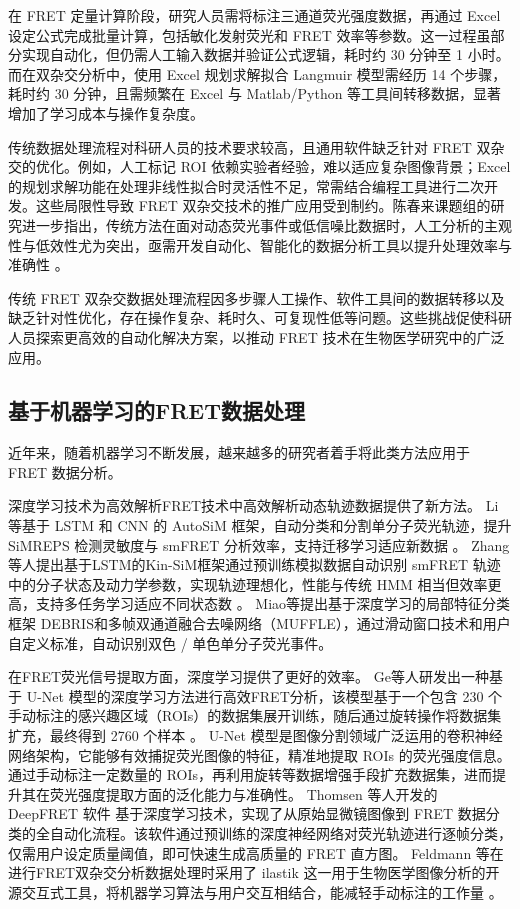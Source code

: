 在 FRET 定量计算阶段，研究人员需将标注三通道荧光强度数据，再通过 Excel 设定公式完成批量计算，包括敏化发射荧光和 FRET 效率等参数。这一过程虽部分实现自动化，但仍需人工输入数据并验证公式逻辑，耗时约 30 分钟至 1 小时。而在双杂交分析中，使用 Excel 规划求解拟合 Langmuir 模型需经历 14 个步骤，耗时约 30 分钟，且需频繁在 Excel 与 Matlab/Python 等工具间转移数据，显著增加了学习成本与操作复杂度。

传统数据处理流程对科研人员的技术要求较高，且通用软件缺乏针对 FRET 双杂交的优化。例如，人工标记 ROI 依赖实验者经验，难以适应复杂图像背景；Excel 的规划求解功能在处理非线性拟合时灵活性不足，常需结合编程工具进行二次开发。这些局限性导致 FRET 双杂交技术的推广应用受到制约。陈春来课题组的研究进一步指出，传统方法在面对动态荧光事件或低信噪比数据时，人工分析的主观性与低效性尤为突出，亟需开发自动化、智能化的数据分析工具以提升处理效率与准确性 。

传统 FRET 双杂交数据处理流程因多步骤人工操作、软件工具间的数据转移以及缺乏针对性优化，存在操作复杂、耗时久、可复现性低等问题。这些挑战促使科研人员探索更高效的自动化解决方案，以推动 FRET 技术在生物医学研究中的广泛应用。

\fi

\subsection{基于机器学习的FRET数据处理}

\ifshowtext
近年来，随着机器学习不断发展，越来越多的研究者着手将此类方法应用于 FRET 数据分析。

深度学习技术为高效解析FRET技术中高效解析动态轨迹数据提供了新方法。
Li等基于 LSTM 和 CNN 的 AutoSiM 框架，自动分类和分割单分子荧光轨迹，提升 SiMREPS 检测灵敏度与 smFRET 分析效率，支持迁移学习适应新数据 。
Zhang等人提出基于LSTM的Kin-SiM框架通过预训练模拟数据自动识别 smFRET 轨迹中的分子状态及动力学参数，实现轨迹理想化，性能与传统 HMM 相当但效率更高，支持多任务学习适应不同状态数 。
Miao等提出基于深度学习的局部特征分类框架 DEBRIS和多帧双通道融合去噪网络（MUFFLE），通过滑动窗口技术和用户自定义标准，自动识别双色 / 单色单分子荧光事件。

在FRET荧光信号提取方面，深度学习提供了更好的效率。
Ge等人研发出一种基于 U-Net 模型的深度学习方法进行高效FRET分析，该模型基于一个包含 230 个手动标注的感兴趣区域（ROIs）的数据集展开训练，随后通过旋转操作将数据集扩充，最终得到 2760 个样本 。
U-Net 模型是图像分割领域广泛运用的卷积神经网络架构，它能够有效捕捉荧光图像的特征，精准地提取 ROIs 的荧光强度信息。
通过手动标注一定数量的 ROIs，再利用旋转等数据增强手段扩充数据集，进而提升其在荧光强度提取方面的泛化能力与准确性。
Thomsen 等人开发的 DeepFRET 软件  基于深度学习技术，实现了从原始显微镜图像到 FRET 数据分类的全自动化流程。该软件通过预训练的深度神经网络对荧光轨迹进行逐帧分类，仅需用户设定质量阈值，即可快速生成高质量的 FRET 直方图。
Feldmann 等在进行FRET双杂交分析数据处理时采用了 ilastik  这一用于生物医学图像分析的开源交互式工具，将机器学习算法与用户交互相结合，能减轻手动标注的工作量 。

